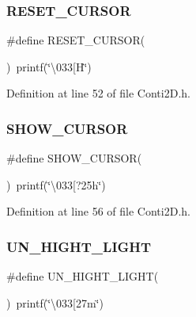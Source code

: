 \mbox{\label{Conti2D_8h_a7c3dbb2345379003d264cc94aeda5f6c_a7c3dbb2345379003d264cc94aeda5f6c}} 
\subsubsection{R\+E\+S\+E\+T\+\_\+\+C\+U\+R\+S\+OR}
{\footnotesize\ttfamily \#define R\+E\+S\+E\+T\+\_\+\+C\+U\+R\+S\+OR(\begin{DoxyParamCaption}{ }\end{DoxyParamCaption})~printf(\char`\"{}\textbackslash{}033[H\char`\"{})}



Definition at line 52 of file Conti2\+D.\+h.

\mbox{\label{Conti2D_8h_ade9c2a563b11982d9d657d3ac3a0ceb1_ade9c2a563b11982d9d657d3ac3a0ceb1}} 
\subsubsection{S\+H\+O\+W\+\_\+\+C\+U\+R\+S\+OR}
{\footnotesize\ttfamily \#define S\+H\+O\+W\+\_\+\+C\+U\+R\+S\+OR(\begin{DoxyParamCaption}{ }\end{DoxyParamCaption})~printf(\char`\"{}\textbackslash{}033[?25h\char`\"{})}



Definition at line 56 of file Conti2\+D.\+h.

\mbox{\label{Conti2D_8h_ab97f6b5de02db4483a7d6bb9bc0c75c0_ab97f6b5de02db4483a7d6bb9bc0c75c0}} 
\subsubsection{U\+N\+\_\+\+H\+I\+G\+H\+T\+\_\+\+L\+I\+G\+HT}
{\footnotesize\ttfamily \#define U\+N\+\_\+\+H\+I\+G\+H\+T\+\_\+\+L\+I\+G\+HT(\begin{DoxyParamCaption}{ }\end{DoxyParamCaption})~printf(\char`\"{}\textbackslash{}033[27m\char`\"{})}




